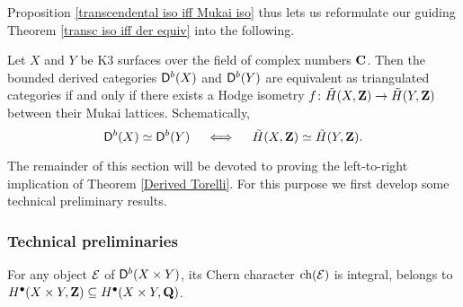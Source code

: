\noindent
Proposition \ref{transcendental iso iff Mukai iso} thus lets us reformulate our guiding Theorem \ref{transc iso iff der equiv} into the following.

\begin{theorem}
    \label{Derived Torelli}
    \emph{\cite[Theorem 4.2.1]{Orlov2003}}
    Let $X$ and $Y$ be K3 surfaces over the field of complex numbers $\mathbf C$. Then the bounded derived categories $\mathsf{D}^b(X)$ and $\mathsf{D}^b(Y)$ are equivalent as triangulated categories if and only if there exists a Hodge isometry $f \colon \,\tilde{\!{H}}(X, \mathbf Z) \to \,\tilde{\!{H}}(Y, \mathbf Z)$ between their Mukai lattices. Schematically,
    \[
        \mathsf{D}^b(X) \simeq \mathsf{D}^b(Y) \quad \iff \quad \,\tilde{\!{H}}(X, \mathbf Z) \simeq \,\tilde{\!{H}}(Y, \mathbf Z).
    \] 
\end{theorem}

The remainder of this section will be devoted to proving the left-to-right implication of Theorem \ref{Derived Torelli}. For this purpose we first develop some technical preliminary results.

\subsubsection*{Technical preliminaries}

\begin{lemma}
    \label{Mukai vector is integral}
    \emph{\cite[Lemma 4.7]{Mukai1987}}
    For any object $\mathcal E$ of $\mathsf{D}^b(X \times Y)$, its Chern character $\ch{\E}$ is integral, \ie belongs to $H^\bullet(X \times Y, \mathbf Z) \subseteq H^\bullet(X \times Y, \mathbf Q)$. 
\end{lemma}

